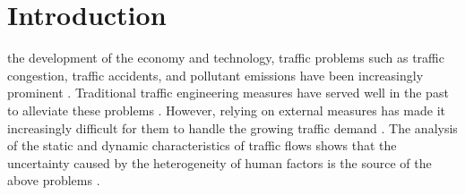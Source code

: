 \documentclass[journal]{IEEEtran}
\begin{document}
%
\IEEEpeerreviewmaketitle



\section{Introduction}
\label{Section 1}
% 
% 
% 
% 
 the development of the economy and technology, traffic problems such as traffic congestion, traffic accidents, and pollutant emissions have been increasingly prominent \citep{Wu2022,Malik2022,Behrendt2022}. Traditional traffic engineering measures have served well in the past to alleviate these problems \citep{Fricker2004,Hay1977}. However, relying on external measures has made it increasingly difficult for them to handle the growing traffic demand \citep{Zhong2020a,Ye2018a}. The analysis of the static and dynamic characteristics of traffic flows shows that the uncertainty caused by the heterogeneity of human factors is the source of the above problems \citep{Arem2016a,Yu2021a,vanLint2016}.
\end{document}
